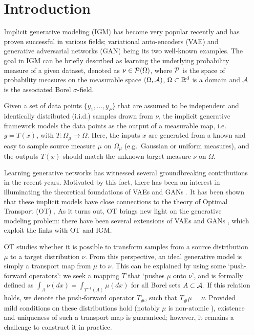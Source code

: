 
\section{Introduction}


Implicit generative modeling (IGM) \cite{diggle1984monte, mohamed2016learning} has become very popular recently and has proven
successful in various fields; variational auto-encoders (VAE) \cite{kingma2013VAE} and generative adversarial networks (GAN) \cite{goodfellow2014generative} being its two well-known examples. The goal in IGM can be briefly described as learning the
underlying probability measure of a given dataset, denoted as $\nu \in {\cal P}(\Omega)$, where ${\cal P}$ is the space of probability measures on the measurable space $(\Omega,\mathcal{A})$, $\Omega \subset \mathbb{R}^d$ is a domain and $\mathcal{A}$ is the associated Borel $\sigma$-field. 

Given a set of data points $\{y_1 , \dots , y_P \}$ that are assumed to be independent and identically distributed (i.i.d.) samples drawn from $\nu$, the implicit generative framework models the data points as the output of a measurable map, i.e.\ $y = T(x)$, with $T: \Omega_\mu \mapsto \Omega$. Here, the inputs $x$ are generated from a known and easy to sample source measure $\mu$ on $\Omega_\mu$ (e.g.\ Gaussian or uniform measures), and the outputs $T(x)$ should match the unknown target measure $\nu$ on $\Omega$. 




Learning generative networks has witnessed several groundbreaking contributions in the recent years. Motivated by this fact, there has been an interest in illuminating the theoretical foundations of VAEs and GANs \cite{bousquet2017optimal,liu2017approximation}. 
%
It has been shown that these implicit models have close connections to the theory of Optimal Transport (OT) \cite{villani2008optimal}, 
%
As it turns out, OT brings new light on the generative modeling problem: there have been several extensions of VAEs \cite{tolstikhin2017wasserstein,kolouri2018sliced} and GANs \cite{arjovsky2017wasserstein,gulrajani2017improved,guo2017relaxed,lei2017geometric}, which exploit the links with OT and IGM. 


OT studies whether it is possible to transform samples from a source distribution $\mu$ to a target distribution $\nu$. From this perspective, an ideal generative model is simply a transport map from $\mu$ to $\nu$.  
This can be explained by using some `push-forward operators': we seek a mapping $T$ that `pushes $\mu$ onto $\nu$', and is formally defined as $\int_A \nu(dx) = \int_{T^{-1}(A)} \mu(dx) $ for all Borel sets $A \subset \mathcal{A}$. If this relation holds, we denote the push-forward operator $T_\#$, such that $T_\# \mu = \nu$. Provided mild conditions on these distributions hold (notably $\mu$ is non-atomic \cite{villani2008optimal}), existence and uniqueness of such a transport map is guaranteed; however, it remains a challenge to construct it in practice.

